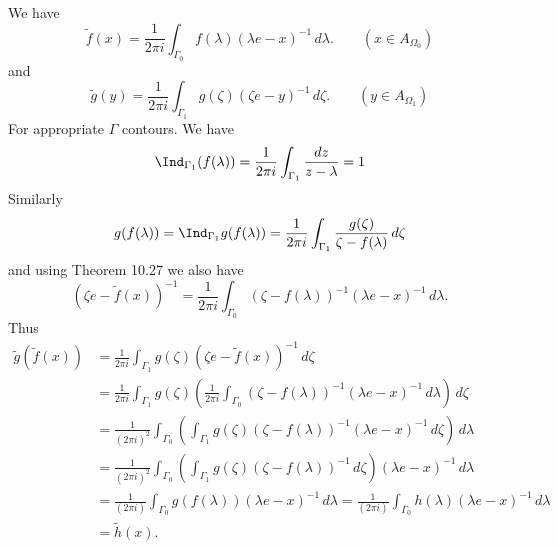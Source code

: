 \begin{enumerate}
\begin{itemize}
We have
\begin{equation*}
\tilde{f}(x)
  = \frac{1}{2\pi i}\int_{\Gamma_0} f(\lambda)(\lambda e - x)^{-1}\,d\lambda.
  \qquad (x\in A_{\Omega_0})
\end{equation*}
and
\begin{equation*}
\tilde{g}(y)
  = \frac{1}{2\pi i}\int_{\Gamma_1} g(\zeta)(\zeta e - y)^{-1}\,d\zeta.
  \qquad (y\in A_{\Omega_1})
\end{equation*}
For appropriate \(\Gamma\) contours.
We have
\begin{equation*}
\Ind_{\Gamma_1} (f(\lambda))
  = \frac{1}{2\pi i}\int_{\Gamma_1} \frac{dz}{z - \lambda}  = 1
\end{equation*}
Similarly
\begin{equation*}
g(f(\lambda)) =
\Ind_{\Gamma_1} g(f(\lambda))
  = \frac{1}{2\pi i}\int_{\Gamma_1} \frac{g(\zeta)}{\zeta - f(\lambda)}\,d\zeta
\end{equation*}
and using Theorem 10.27 we also have
\begin{equation*}
\left(\zeta e - \tilde{f}(x)\right)^{-1}
 = \frac{1}{2\pi i}\int_{\Gamma_0}
   (\zeta - f(\lambda))^{-1}(\lambda e - x)^{-1}\,d\lambda.
\end{equation*}
Thus
\begin{align}
\widetilde{g}\left(\widetilde{f}(x)\right)
  &= \frac{1}{2\pi i}\int_{\Gamma_1}
    g(\zeta)\left(\zeta e - \widetilde{f}(x)\right)^{-1}\,d\zeta \nonumber \\
  &= \frac{1}{2\pi i}\int_{\Gamma_1}
    g(\zeta)
      \left(
        \frac{1}{2\pi i}\int_{\Gamma_0}
          (\zeta - f(\lambda))^{-1}(\lambda e - x)^{-1}\,d\lambda
      \right)\,d\zeta \nonumber \\
  &= \frac{1}{(2\pi i)^2}  
    \int_{\Gamma_0}
      \left(
        \int_{\Gamma_1}
          g(\zeta)
          (\zeta - f(\lambda))^{-1}(\lambda e - x)^{-1}\,d\zeta
      \right)
      \,d\lambda  \label{eq:10.14:fubini} \\
  &= \frac{1}{(2\pi i)^2}
    \int_{\Gamma_0}
      \left(
        \int_{\Gamma_1}
          g(\zeta)
          (\zeta - f(\lambda))^{-1}\,d\zeta
      \right)
      (\lambda e - x)^{-1}
      \,d\lambda \nonumber \\
  &= \frac{1}{(2\pi i)} \int_{\Gamma_0} g(f(\lambda))(\lambda e - x)^{-1}\,d\lambda
    = \frac{1}{(2\pi i)} \int_{\Gamma_0} h(\lambda)(\lambda e - x)^{-1}\,d\lambda
      \nonumber \\
  &= \widetilde{h}(x) \nonumber.

\end{align}
\end{itemize}
\end{enumerate}
